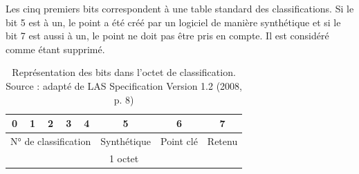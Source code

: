 Les cinq premiers bits correspondent à une table standard des classifications.
Si le bit 5 est à un, le point a été créé par un logiciel de manière synthétique et si le bit 7 est aussi à un, le point ne doit pas être pris en compte. Il est considéré comme étant supprimé.

\begin{table}[!h]
\centering
\begin{tabular}{ccccclll}
\hline
\multicolumn{1}{|c|}{0} & \multicolumn{1}{c|}{1} & \multicolumn{1}{c|}{2} & \multicolumn{1}{c|}{3} & \multicolumn{1}{c|}{4} & \multicolumn{1}{c|}{5}           & \multicolumn{1}{c|}{6}         & \multicolumn{1}{c|}{7}      \\ \hline
\multicolumn{5}{|c|}{N° de classification}                                                                                  & \multicolumn{1}{l|}{Synthétique} & \multicolumn{1}{l|}{Point clé} & \multicolumn{1}{c|}{Retenu} \\ \hline
\multicolumn{8}{c}{1 octet}                                                                                                                                                                                                  
\end{tabular}
\caption{ Représentation des bits dans l'octet de classification. Source : adapté de LAS Specification Version 1.2 (2008, p. 8)}
\label{tab:las_class_byte_explanation}
\end{table}

